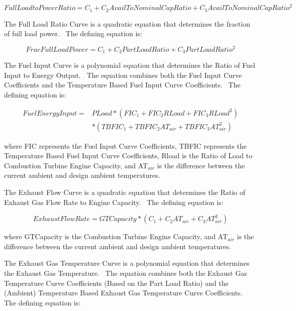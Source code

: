 \begin{equation}
FullLoadtoPowerRatio = {C_1} + {C_2}AvailToNominalCapRatio + {C_3}AvailToNominalCapRati{o^2}
\end{equation}

The Full Load Ratio Curve is a quadratic equation that determines the fraction of full load power.~ The defining equation is:

\begin{equation}
FracFullLoadPower = {C_1} + {C_2}PartLoadRatio + {C_3}PartLoadRati{o^2}
\end{equation}

The Fuel Input Curve is a polynomial equation that determines the Ratio of Fuel Input to Energy Output.~ The equation combines both the Fuel Input Curve Coefficients and the Temperature Based Fuel Input Curve Coefficients.~ The defining equation is:

\begin{equation}
\begin{split}
FuelEnergyInput =& PLoad * (FI{C_1} + FI{C_2}RLoad + FI{C_3}RLoa{d^2}) \\
&* (TBFI{C_1} + TBFI{C_2}A{T_{air}} + TBFI{C_3}AT_{air}^2)
\end{split}
\end{equation}

where FIC represents the Fuel Input Curve Coefficients, TBFIC represents the Temperature Based Fuel Input Curve Coefficients, Rload is the Ratio of Load to Combustion Turbine Engine Capacity, and AT\(_{air}\) is the difference between the current ambient and design ambient temperatures.

The Exhaust Flow Curve is a quadratic equation that determines the Ratio of Exhaust Gas Flow Rate to Engine Capacity.~ The defining equation is:

\begin{equation}
ExhaustFlowRate = GTCapacity * ({C_1} + {C_2}A{T_{air}} + {C_3}AT_{air}^2)
\end{equation}

where GTCapacity is the Combustion Turbine Engine Capacity, and AT\(_{air}\) is the difference between the current ambient and design ambient temperatures.

The Exhaust Gas Temperature Curve is a polynomial equation that determines the Exhaust Gas Temperature.~ The equation combines both the Exhaust Gas Temperature Curve Coefficients (Based on the Part Load Ratio) and the (Ambient) Temperature Based Exhaust Gas Temperature Curve Coefficients.~ The defining equation is:

